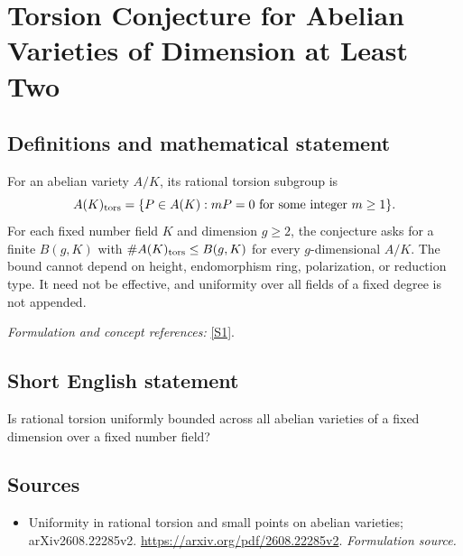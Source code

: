 \documentclass[11pt]{article}
\begin{document}
\section*{\texorpdfstring{Torsion Conjecture for Abelian Varieties of Dimension at Least Two}{Torsion Conjecture for Abelian Varieties of Dimension at Least Two}}\label{30006748}
\subsection{Definitions and mathematical statement}
For an abelian variety $A/K$, its rational torsion subgroup is
\[
 A(K)_{\rm tors}=\{P\in A(K):mP=0\text{ for some integer }m\ge1\}.
\]
For each fixed number field $K$ and dimension $g\ge2$, the conjecture asks for a finite $B(g,K)$ with $\#A(K)_{\rm tors}\le B(g,K)$ for every $g$-dimensional $A/K$. The bound cannot depend on height, endomorphism ring, polarization, or reduction type. It need not be effective, and uniformity over all fields of a fixed degree is not appended.
\par\smallskip\textit{Formulation and concept references:} \href{https://arxiv.org/pdf/2608.22285v2}{[S1]}.

\subsection{Short English statement}
Is rational torsion uniformly bounded across all abelian varieties of a fixed dimension over a fixed number field?
\subsection{Sources}
\begin{itemize}
\item[S1]Uniformity in rational torsion and small points on abelian varieties; arXiv2608.22285v2.
\url{https://arxiv.org/pdf/2608.22285v2}.
\textit{Formulation source.}
\end{itemize}
\end{document}
